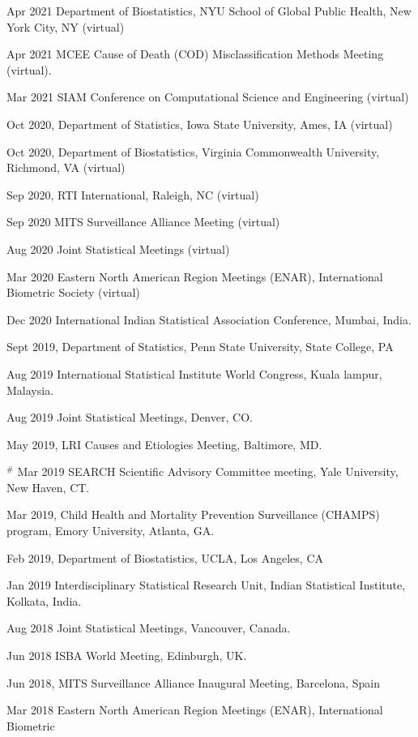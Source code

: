 \documentclass[12pt]{article}
\begin{document}
\item Apr 2021 Department of Biostatistics, NYU School of Global Public Health, New York City, NY (virtual)
\item Apr 2021 MCEE Cause of Death (COD) Misclassification Methods Meeting (virtual).
\item Mar 2021 SIAM Conference on Computational Science and Engineering (virtual)
\item Oct 2020, Department of Statistics, Iowa State University, Ames, IA (virtual)
\item Oct 2020, Department of Biostatistics, Virginia Commonwealth University, Richmond, VA (virtual)
\item Sep 2020, RTI International, Raleigh, NC (virtual)
\item Sep 2020 MITS Surveillance Alliance Meeting (virtual)
\item Aug 2020 Joint Statistical Meetings (virtual)
\item Mar 2020 Eastern North American Region Meetings (ENAR), International Biometric Society (virtual)
\item Dec 2020 International Indian Statistical Association Conference, Mumbai, India.
\item Sept 2019, Department of Statistics, Penn State University, State College, PA
\item Aug 2019 International Statistical Institute World Congress, Kuala lampur, Malaysia.
\item Aug 2019 Joint Statistical Meetings, Denver, CO.
\item May 2019, LRI Causes and Etiologies Meeting, Baltimore, MD.
\item $^\#$ Mar 2019 SEARCH Scientific Advisory Committee meeting, Yale University, New Haven, CT. 
\item Mar 2019, Child Health and Mortality Prevention Surveillance (CHAMPS) program, Emory University, Atlanta, GA.
\item Feb 2019, Department of Biostatistics, UCLA, Los Angeles, CA
\item Jan 2019 Interdisciplinary Statistical Research Unit, Indian Statistical Institute, Kolkata,
India.
\item Aug 2018 Joint Statistical Meetings, Vancouver, Canada.
\item Jun 2018 ISBA World Meeting, Edinburgh, UK.
\item Jun 2018, MITS Surveillance Alliance Inaugural Meeting, Barcelona, Spain
\item Mar 2018 Eastern North American Region Meetings (ENAR), International Biometric
\end{document}
